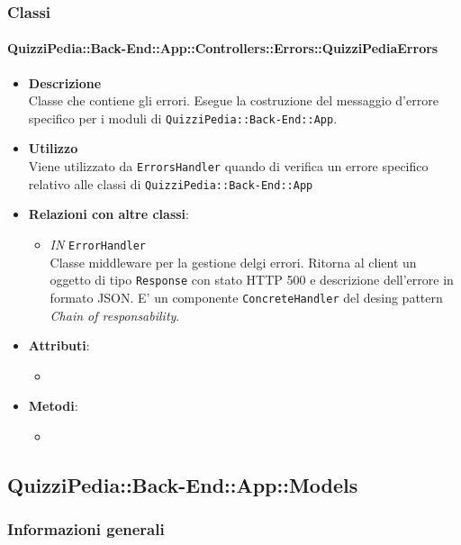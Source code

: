 \subsubsection{Classi}
\paragraph{QuizziPedia::Back-End::App::Controllers::Errors::QuizziPediaErrors}
	\begin{itemize}
		\item \textbf{Descrizione} \\
		Classe che contiene gli errori. Esegue la costruzione del messaggio d'errore specifico per i moduli di \texttt{QuizziPedia::Back-End::App}.
		\item \textbf{Utilizzo} \\
		Viene utilizzato da \texttt{ErrorsHandler} quando di verifica un errore specifico relativo alle classi di \texttt{QuizziPedia::Back-End::App}
		\item \textbf{Relazioni con altre classi}:
			 \begin{itemize}
			 	\item \textit{IN} \texttt{ErrorHandler} \\
			 	Classe middleware per la gestione delgi errori. Ritorna al client un oggetto di tipo \texttt{Response} con stato HTTP 500 e descrizione dell'errore in formato JSON. E' un componente \texttt{ConcreteHandler} del desing pattern \textit{Chain of responsability}.
			 \end{itemize}
		\item \textbf{Attributi}:
			 \begin{itemize}
			 	\item 
			 \end{itemize}
		\item \textbf{Metodi}:
			\begin{itemize}
				\item 
			\end{itemize}
	\end{itemize}



\subsection{QuizziPedia::Back-End::App::Models}
\subsubsection{Informazioni generali}
